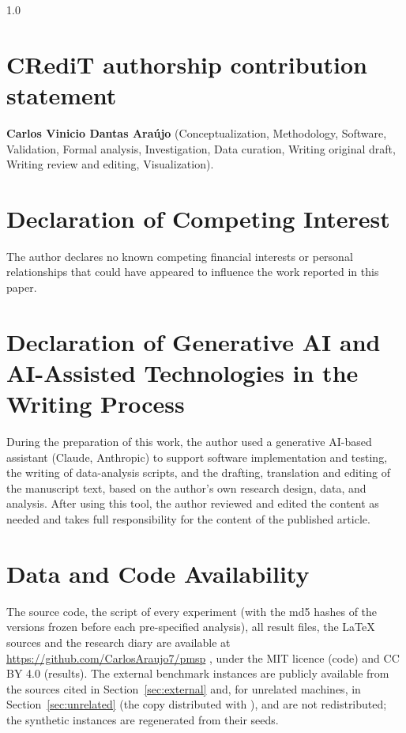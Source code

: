 \begingroup
\small
\begin{spacing}{1.0}

\section*{CRediT authorship contribution statement}
\textbf{Carlos Vinicio Dantas Ara\'{u}jo} (Conceptualization, Methodology,
Software, Validation, Formal analysis, Investigation, Data curation,
Writing original draft, Writing review and editing, Visualization). 

\section*{Declaration of Competing Interest}
The author declares no known competing financial interests or personal
relationships that could have appeared to influence the work reported
in this paper.

\section*{Declaration of Generative AI and AI-Assisted Technologies in the Writing Process}
During the preparation of this work, the author used a generative
AI-based assistant (Claude, Anthropic) to support software implementation
and testing, the writing of data-analysis scripts, and the drafting,
translation and editing of the manuscript text, based on the author's own
research design, data, and analysis. After using this tool, the author reviewed
and edited the content as needed and takes full responsibility for the
content of the published article. 

\section*{Data and Code Availability}
The source code, the script of every experiment (with the md5 hashes of the
versions frozen before each pre-specified analysis), all result files, the
LaTeX sources and the research diary are available at \url{https://github.com/CarlosAraujo7/pmsp} , under the MIT licence (code) and CC BY 4.0
(results). The external benchmark instances are publicly available from the
sources cited in Section~\ref{sec:external} and, for unrelated machines, in Section~\ref{sec:unrelated} (the copy distributed with \citealp{AbladEtAl2021}), and are not redistributed; the
synthetic instances are regenerated from their seeds.


\end{spacing}
